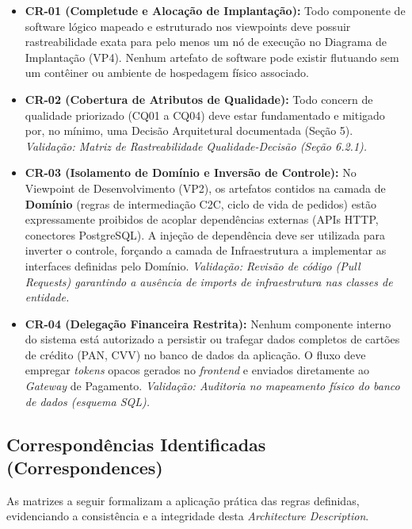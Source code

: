 ﻿\documentclass[12pt,a4paper]{article}
\begin{document}
\begin{itemize}[noitemsep]
    \item \textbf{CR-01 (Completude e Alocação de Implantação):} Todo componente de software lógico mapeado e estruturado nos viewpoints deve possuir rastreabilidade exata para pelo menos um nó de execução no Diagrama de Implantação (VP4). Nenhum artefato de software pode existir flutuando sem um contêiner ou ambiente de hospedagem físico associado. 
    
    \item \textbf{CR-02 (Cobertura de Atributos de Qualidade):} Todo concern de qualidade priorizado (CQ01 a CQ04) deve estar fundamentado e mitigado por, no mínimo, uma Decisão Arquitetural documentada (Seção 5). 
    \textit{Validação: Matriz de Rastreabilidade Qualidade-Decisão (Seção 6.2.1).}
    
    \item \textbf{CR-03 (Isolamento de Domínio e Inversão de Controle):} No Viewpoint de Desenvolvimento (VP2), os artefatos contidos na camada de \textbf{Domínio} (regras de intermediação C2C, ciclo de vida de pedidos) estão expressamente proibidos de acoplar dependências externas (APIs HTTP, conectores PostgreSQL). A injeção de dependência deve ser utilizada para inverter o controle, forçando a camada de Infraestrutura a implementar as interfaces definidas pelo Domínio.
    \textit{Validação: Revisão de código (\textit{Pull Requests}) garantindo a ausência de \textit{imports} de infraestrutura nas classes de entidade.}
    
    \item \textbf{CR-04 (Delegação Financeira Restrita):} Nenhum componente interno do sistema está autorizado a persistir ou trafegar dados completos de cartões de crédito (PAN, CVV) no banco de dados da aplicação. O fluxo deve empregar \textit{tokens} opacos gerados no \textit{frontend} e enviados diretamente ao \textit{Gateway} de Pagamento.
    \textit{Validação: Auditoria no mapeamento físico do banco de dados (esquema SQL).}
\end{itemize}

\subsection{Correspondências Identificadas (Correspondences)}

As matrizes a seguir formalizam a aplicação prática das regras definidas, evidenciando a consistência e a integridade desta \textit{Architecture Description}.
\end{document}
